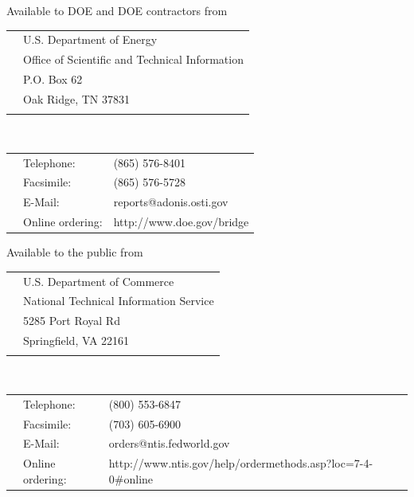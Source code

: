 {{\begin{minipage}[t]{5.0in}
            Available to DOE and DOE contractors from\\
            \begin{tabular}{ll}
                \hspace*{\coverindent} & U.S. Department of Energy \\
                & Office of Scientific and Technical Information \\
                & P.O. Box 62 \\
                & Oak Ridge, TN 37831 \\
                &  \\
            \end{tabular}
            \\
            \begin{tabular}{lll}
                \hspace*{\coverindent} & Telephone: & (865) 576-8401\\
                & Facsimile: & (865) 576-5728\\
                & E-Mail: &         reports@adonis.osti.gov\\
                & Online ordering: & http://www.doe.gov/bridge\\
            \end{tabular}
            \vspace{\baselineskip}
            \vspace{0.25in}

            Available to the public from\\
            \begin{tabular}{ll}
                \hspace*{\coverindent} & U.S. Department of Commerce \\
                & National Technical Information Service \\
                & 5285 Port Royal Rd \\
                & Springfield, VA 22161 \\
                &  \\
            \end{tabular}
            \\
            \begin{tabular}{lll}
                \hspace*{\coverindent} & Telephone: & (800) 553-6847 \\
                & Facsimile: & (703) 605-6900 \\
                & E-Mail: & orders@ntis.fedworld.gov \\
                & Online ordering: & http://www.ntis.gov/help/ordermethods.asp?loc=7-4-0\#online \\
            \end{tabular}
            \vspace{\baselineskip}
            \vspace{0.125in}


\end{minipage}}}
